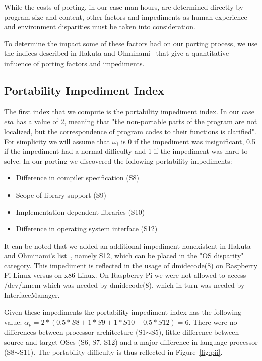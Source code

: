 While the costs of porting, in our case man-hours, are determined directly by
program size and content, other factors and impediments as human experience and
environment disparities must be taken into consideration.

To determine the impact some of these factors had on our porting process, we
use the indices described in Hakuta and Ohminami~\cite{hakuta} that give
a quantitative influence of porting factors and impediments.

\subsection{Portability Impediment Index}

The first index that we compute is the portability impediment index. In our
case $eta$ has a value of 2, meaning that "the non-portable parts of the program
are not localized, but the correspondence of program codes to their functions is
clarified". For simplicity we will assume that $\omega_i$ is 0 if the impediment
was insignificant, 0.5 if the impediment had a normal difficulty and 1 if the
impediment was hard to solve. In our porting we discovered the following
portability impediments:
\begin{itemize}
    \item Difference in compiler specification (S8)
    \item Scope of library support (S9)
    \item Implementation-dependent libraries (S10)
    \item Difference in operating system interface (S12)
\end{itemize}

It can be noted that we added an additional impediment nonexistent in Hakuta and
Ohminami's list~\cite{hakuta}, namely S12, which can be placed in the "OS disparity"
category. This impediment is reflected in the usage of dmidecode(8) on Raspberry
Pi Linux versus on x86 Linux. On Raspberry Pi we were not allowed to access
/dev/kmem which was needed by dmidecode(8), which in turn was needed by
InterfaceManager.

Given these impediments the portability impediment index has the following
value: $\alpha_p = 2 * (0.5 * S8 + 1 * S9 + 1 * S10 + 0.5 * S12) = 6$.  There
were no differences between processor architecture (S1$\sim$S5), little difference
between source and target OSes (S6, S7, S12) and a major difference in language
processor (S8$\sim$S11). The portability difficulty is thus reflected in
Figure~\ref{fig:pii}.

